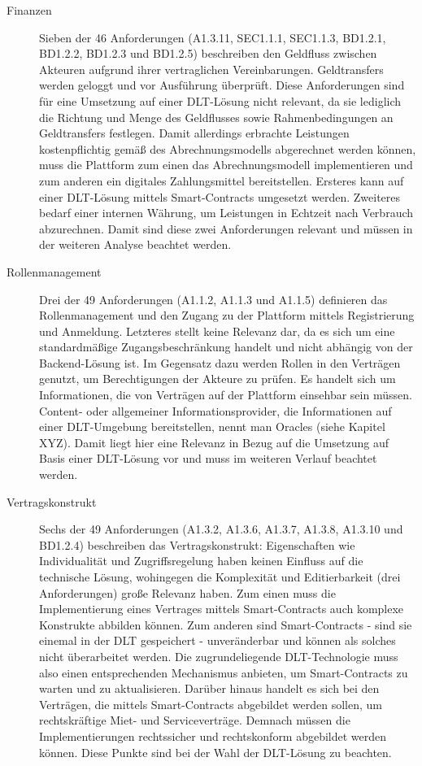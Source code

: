 \begin{description}
  \item[Finanzen] Sieben der 46 Anforderungen (A1.3.11, SEC1.1.1, SEC1.1.3, BD1.2.1, BD1.2.2, BD1.2.3 und BD1.2.5) beschreiben den Geldfluss zwischen Akteuren aufgrund ihrer vertraglichen Vereinbarungen. Geldtransfers werden geloggt und vor Ausführung überprüft. Diese Anforderungen sind für eine Umsetzung auf einer \ac{DLT}-Lösung nicht relevant, da sie lediglich die Richtung und Menge des Geldflusses sowie Rahmenbedingungen an Geldtransfers festlegen. Damit allerdings erbrachte Leistungen kostenpflichtig gemäß des Abrechnungsmodells abgerechnet werden können, muss die Plattform zum einen das Abrechnungsmodell implementieren und zum anderen ein digitales Zahlungsmittel bereitstellen. Ersteres kann auf einer \ac{DLT}-Lösung mittels Smart-Contracts umgesetzt werden. Zweiteres bedarf einer internen Währung, um Leistungen in Echtzeit nach Verbrauch abzurechnen. Damit sind diese zwei Anforderungen relevant und müssen in der weiteren Analyse beachtet werden.
  \item[Rollenmanagement] Drei der 49 Anforderungen (A1.1.2, A1.1.3 und A1.1.5) definieren das Rollenmanagement und den Zugang zu der Plattform mittels Registrierung und Anmeldung. Letzteres stellt keine Relevanz dar, da es sich um eine standardmäßige Zugangsbeschränkung handelt und nicht abhängig von der Backend-Lösung ist. Im Gegensatz dazu werden Rollen in den Verträgen genutzt, um Berechtigungen der Akteure zu prüfen. Es handelt sich um Informationen, die von Verträgen auf der Plattform einsehbar sein müssen. Content- oder allgemeiner Informationsprovider, die Informationen auf einer \ac{DLT}-Umgebung bereitstellen, nennt man Oracles (siehe Kapitel XYZ). Damit liegt hier eine Relevanz in Bezug auf die Umsetzung auf Basis einer \ac{DLT}-Lösung vor und muss im weiteren Verlauf beachtet werden.
  \item[Vertragskonstrukt] Sechs der 49 Anforderungen (A1.3.2, A1.3.6, A1.3.7, A1.3.8, A1.3.10 und BD1.2.4) beschreiben das Vertragskonstrukt: Eigenschaften wie Individualität und Zugriffsregelung haben keinen Einfluss auf die technische Lösung, wohingegen die Komplexität und Editierbarkeit (drei Anforderungen) große Relevanz haben. Zum einen muss die Implementierung eines Vertrages mittels Smart-Contracts auch komplexe Konstrukte abbilden können. Zum anderen sind Smart-Contracts - sind sie einemal in der \ac{DLT} gespeichert - unveränderbar und können als solches nicht überarbeitet werden. Die zugrundeliegende \ac{DLT}-Technologie muss also einen entsprechenden Mechanismus anbieten, um Smart-Contracts zu warten und zu aktualisieren. Darüber hinaus handelt es sich bei den Verträgen, die mittels Smart-Contracts abgebildet werden sollen, um rechtskräftige Miet- und Serviceverträge. Demnach müssen die Implementierungen rechtssicher und rechtskonform abgebildet werden können. Diese Punkte sind bei der Wahl der \ac{DLT}-Lösung zu beachten.
\end{description}


